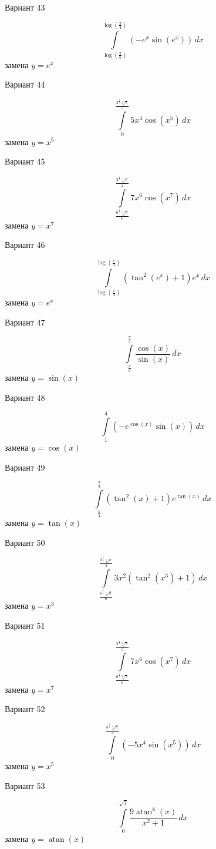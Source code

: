 \documentclass[11pt]{report}
\begin{document}
Вариант 43

$$\int\limits_{\log{\left(\frac{\pi}{6} \right)}}^{\log{\left(\frac{\pi}{4} \right)}} \left(- e^{x} \sin{\left(e^{x} \right)}\right)\, dx$$
замена $y = e^{x}$

Вариант 44

$$\int\limits_{0}^{\frac{3^{\frac{4}{5}} \sqrt[5]{\pi}}{3}} 5 x^{4} \cos{\left(x^{5} \right)}\, dx$$
замена $y = x^{5}$

Вариант 45

$$\int\limits_{\frac{6^{\frac{6}{7}} \sqrt[7]{\pi}}{6}}^{\frac{2^{\frac{5}{7}} \sqrt[7]{\pi}}{2}} 7 x^{6} \cos{\left(x^{7} \right)}\, dx$$
замена $y = x^{7}$

Вариант 46

$$\int\limits_{\log{\left(\frac{\pi}{4} \right)}}^{\log{\left(\frac{\pi}{3} \right)}} \left(\tan^{2}{\left(e^{x} \right)} + 1\right) e^{x}\, dx$$
замена $y = e^{x}$

Вариант 47

$$\int\limits_{\frac{\pi}{6}}^{\frac{\pi}{3}} \frac{\cos{\left(x \right)}}{\sin{\left(x \right)}}\, dx$$
замена $y = \sin{\left(x \right)}$

Вариант 48

$$\int\limits_{1}^{4} \left(- e^{\cos{\left(x \right)}} \sin{\left(x \right)}\right)\, dx$$
замена $y = \cos{\left(x \right)}$

Вариант 49

$$\int\limits_{\frac{\pi}{4}}^{\frac{\pi}{3}} \left(\tan^{2}{\left(x \right)} + 1\right) e^{\tan{\left(x \right)}}\, dx$$
замена $y = \tan{\left(x \right)}$

Вариант 50

$$\int\limits_{\frac{6^{\frac{2}{3}} \sqrt[3]{\pi}}{6}}^{\frac{3^{\frac{2}{3}} \sqrt[3]{\pi}}{3}} 3 x^{2} \left(\tan^{2}{\left(x^{3} \right)} + 1\right)\, dx$$
замена $y = x^{3}$

Вариант 51

$$\int\limits_{\frac{6^{\frac{6}{7}} \sqrt[7]{\pi}}{6}}^{\frac{2^{\frac{5}{7}} \sqrt[7]{\pi}}{2}} 7 x^{6} \cos{\left(x^{7} \right)}\, dx$$
замена $y = x^{7}$

Вариант 52

$$\int\limits_{0}^{\frac{3^{\frac{4}{5}} \sqrt[5]{\pi}}{3}} \left(- 5 x^{4} \sin{\left(x^{5} \right)}\right)\, dx$$
замена $y = x^{5}$

Вариант 53

$$\int\limits_{0}^{\sqrt{3}} \frac{9 \operatorname{atan}^{8}{\left(x \right)}}{x^{2} + 1}\, dx$$
замена $y = \operatorname{atan}{\left(x \right)}$
\end{document}
